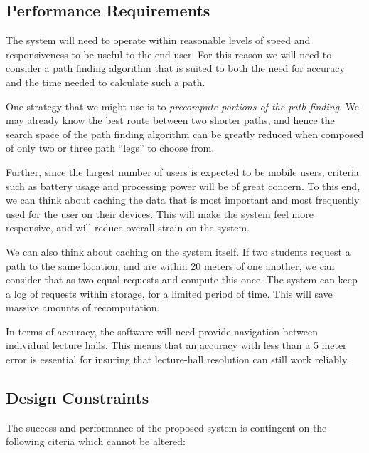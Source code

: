 \documentclass[12pt,a4paper]{article}
\begin{document}
	    
		\subsection{Performance Requirements}

			The system will need to operate within reasonable levels of speed and
			responsiveness to be useful to the end-user. For this reason we will need
			to consider a path finding algorithm that is suited to both the need for
			accuracy and the time needed to calculate such a path.

			\medskip

			One strategy that we might use is to \textsl{precompute portions of the
			path-finding}. We may already know the best route between two shorter
			paths, and hence the search space of the path finding algorithm can be
			greatly reduced when composed of only two or three path ``legs'' to choose
			from.

			\medskip

			Further, since the largest number of users is expected to be mobile users,
			criteria such as battery usage and processing power will be of
			great concern. To this end, we can think about caching the data that is
			most important and most frequently used for the user on their devices.
			This will make the system feel more responsive, and will reduce overall
			strain on the system.

			\medskip

			We can also think about caching on the system itself. If two students
			request a path to the same location, and are within 20 meters of one
			another, we can consider that as two equal requests and compute this once.
			The system can keep a log of requests within storage, for a limited period
			of time. This will save massive amounts of recomputation.

			\medskip

			In terms of accuracy, the software will need provide navigation between
			individual lecture halls. This means that an accuracy with less than a 5
			meter error is essential for insuring that lecture-hall resolution can
			still work reliably.

		\subsection{Design Constraints}

			The success and performance of the proposed system is contingent on the
			following citeria which cannot be altered:
\end{document}
